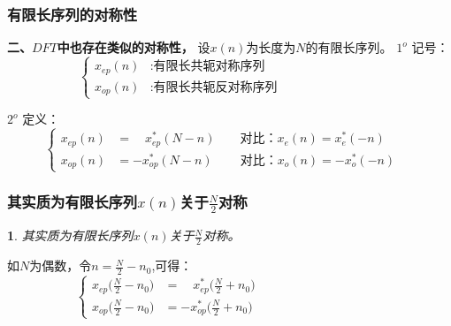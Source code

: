 \documentclass[notheorems,compress,mathserif,table]{beamer}
\newtheorem{dablock}{}
\begin{document}
\begin{frame}[shrink]\frametitle{有限长序列的对称性}%
\textbf{二、$DFT$中也存在类似的对称性，}
\newline
设$x(n)$为长度为$N$的有限长序列。
\newline
$1^o$ 记号：
\begin{equation*} %
\left\{ \begin{aligned}
    x_{ep}(n) &: \mbox{有限长共轭对称序列}  \quad\quad\quad\quad\quad\quad\quad\quad\quad\\
    x_{op}(n) &: \mbox{有限长共轭反对称序列}
\end{aligned} \right.
\end{equation*}

$2^o$ 定义：
\begin{equation*} %
\left\{ \begin{aligned}
    x_{ep}(n) &= \quad x_{ep}^*(N-n)  \quad\quad\mbox{对比：}  x_{e}(n) = x_{e}^*(-n) \quad\quad\\
    x_{op}(n) &= -x_{op}^*(N-n)       \:\quad\quad\mbox{对比：}       x_{o}(n) = -x_{o}^*(-n)
\end{aligned} \right.
\end{equation*}
\end{frame}






\begin{frame}[shrink]\frametitle{其实质为有限长序列$x(n)$关于$\frac{N}{2}$对称}%
\begin{dablock}
其实质为有限长序列$x(n)$关于$\frac{N}{2}$对称。
\end{dablock}
如$N$为偶数，令$n=\frac{N}{2}-n_0$,可得：
\begin{equation*} %
\left\{ \begin{aligned}
    x_{ep}\big(\frac{N}{2}-n_0\big) &= \quad x_{ep}^*\big(\frac{N}{2}+n_0\big)  \quad\quad\quad\quad\quad\quad\quad\quad\quad\quad\\
    x_{op}\big(\frac{N}{2}-n_0\big) &= -x_{op}^*\big(\frac{N}{2}+n_0\big)
\end{aligned} \right.
\end{equation*}
\end{frame}
\end{document}
